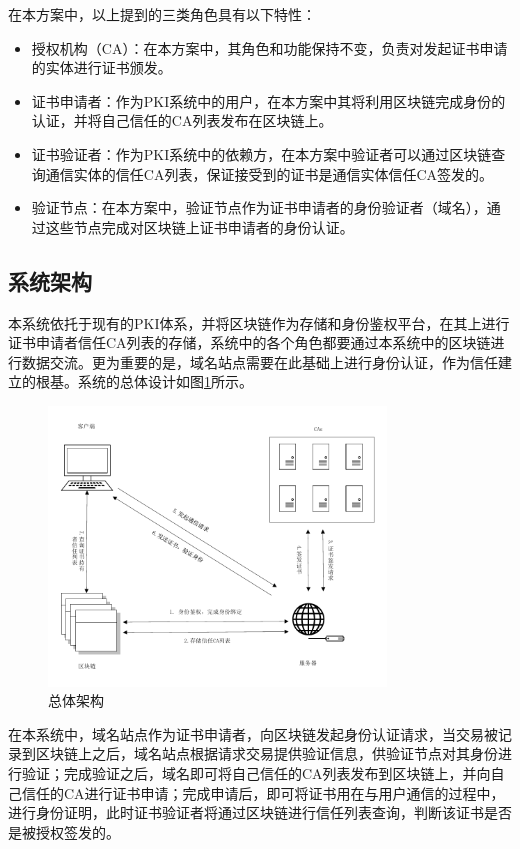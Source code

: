 在本方案中，以上提到的三类角色具有以下特性：
\begin{itemize}
	\item 授权机构（CA）：在本方案中，其角色和功能保持不变，负责对发起证书申请的实体进行证书颁发。
	\item 证书申请者：作为PKI系统中的用户，在本方案中其将利用区块链完成身份的认证，并将自己信任的CA列表发布在区块链上。
	\item 证书验证者：作为PKI系统中的依赖方，在本方案中验证者可以通过区块链查询通信实体的信任CA列表，保证接受到的证书是通信实体信任CA签发的。
	\item 验证节点：在本方案中，验证节点作为证书申请者的身份验证者（域名），通过这些节点完成对区块链上证书申请者的身份认证。
\end{itemize}

\subsection{系统架构}

本系统依托于现有的PKI体系，并将区块链作为存储和身份鉴权平台，在其上进行证书申请者信任CA列表的存储，系统中的各个角色都要通过本系统中的区块链进行数据交流。更为重要的是，域名站点需要在此基础上进行身份认证，作为信任建立的根基。系统的总体设计如图\ref{fig:test}所示。


\begin{figure}[htbp]
 	\centering
 	\includegraphics[width = 0.8\textwidth]{img/art}
 	\caption{总体架构}\label{fig:test}
\end{figure}


在本系统中，域名站点作为证书申请者，向区块链发起身份认证请求，当交易被记录到区块链上之后，域名站点根据请求交易提供验证信息，供验证节点对其身份进行验证；完成验证之后，域名即可将自己信任的CA列表发布到区块链上，并向自己信任的CA进行证书申请；完成申请后，即可将证书用在与用户通信的过程中，进行身份证明，此时证书验证者将通过区块链进行信任列表查询，判断该证书是否是被授权签发的。



